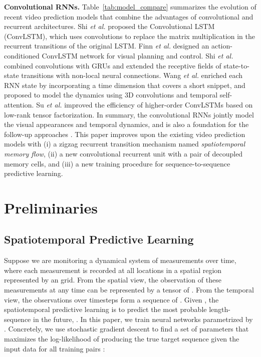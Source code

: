 \documentclass[10pt,journal,compsoc]{IEEEtran}
\newcommand{\tab}[1]{Table~\ref{#1}}
\newcommand{\myparagraph}[1]{\vspace{5pt} \noindent \textbf{#1.}}
\begin{document}
\myparagraph{Convolutional RNNs}
\tab{tab:model_compare} summarizes the evolution of recent video prediction models that combine the advantages of convolutional and recurrent architectures. 
Shi \textit{et al.} \cite{shi2015convolutional} proposed the Convolutional LSTM (ConvLSTM), which uses convolutions to replace the matrix multiplication in the recurrent transitions of the original LSTM. 
Finn \textit{et al.} \cite{Finn2016Unsupervised} designed an action-conditioned ConvLSTM network for visual planning and control.
Shi \textit{et al.} \cite{shi2017deep} combined convolutions with GRUs \cite{Cho2014On} and extended the receptive fields of state-to-state transitions with non-local neural connections. 
Wang \textit{et al.} \cite{wang2019eidetic} enriched each RNN state by incorporating a time dimension that covers a short snippet, and proposed to model the dynamics using 3D convolutions and temporal self-attention. 
Su \textit{et al.} \cite{su2020convolutional} improved the efficiency of higher-order ConvLSTMs based on low-rank tensor factorization. 
In summary, the convolutional RNNs jointly model the visual appearances and temporal dynamics, and is also a foundation for the follow-up approaches \cite{patraucean2015spatio,Finn2016Unsupervised,Lotter2016Deep,Kalchbrenner2016Video,shi2017deep,wang2018predrnn++,byeon2018contextvp,oliu2018folded,xu2018structure,wang2019memory,wang2019eidetic,yu2020efficient,su2020convolutional,wu2021motionrnn}. 
This paper improves upon the existing video prediction models with (i) a zigzag recurrent transition mechanism named \textit{spatiotemporal memory flow}, (ii) a new convolutional recurrent unit with a pair of decoupled memory cells, and (iii) a new training procedure for sequence-to-sequence predictive learning. 



\section{Preliminaries}

\subsection{Spatiotemporal Predictive Learning}

Suppose we are monitoring a dynamical system of  measurements over time, where each measurement is recorded at all locations in a spatial region represented by an  grid. 
From the spatial view, the observation of these  measurements at any time can be represented by a tensor of . 
From the temporal view, the observations over  timesteps form a sequence of . 
Given , the spatiotemporal predictive learning is to predict the most probable length- sequence in the future, .
In this paper, we train neural networks parametrized by . Concretely, we use stochastic gradient descent to find a set of parameters  that maximizes the log-likelihood of producing the true target sequence  given the input data  for all training pairs :
\end{document}
